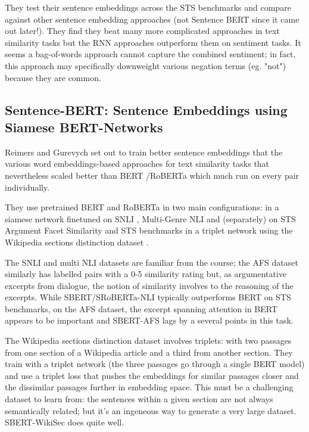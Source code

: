 \documentclass[11pt]{article}
\begin{document}
They test their sentence embeddings across the STS benchmarks and compare against other sentence embedding approaches (not Sentence BERT since it came out later!). They find they beat many more complicated approaches in text similarity tasks but the RNN approaches outperform them on sentiment tasks. It seems a bag-of-words approach cannot capture the combined sentiment; in fact, this approach may specifically downweight various negation terms (eg. "not") because they are common.

\subsection{Sentence-BERT: Sentence Embeddings using Siamese BERT-Networks \cite{Reimers2019}}

Reimers and Gurevych set out to train better sentence embeddings that the various word embeddings-based approaches for text similarity tasks that nevertheless scaled better than BERT /RoBERTa which much run on every pair individually. 

They use pretrained BERT and RoBERTa in two main configurations: in a siamese network finetuned on SNLI \cite{Bowman2015}, Multi-Genre NLI \cite{Williams2018} and (separately) on STS Argument Facet Similarity \cite{Misra2016} and STS benchmarks \cite{Cer2017} in a triplet network using the Wikipedia sections distinction dataset \cite{Dor2018}. 

The SNLI and multi NLI datasets are familiar from the course; the AFS dataset similarly has labelled pairs with a 0-5 similarity rating but, as argumentative excerpts from dialogue, the notion of similarity involves to the reasoning of the excerpts. While SBERT/SRoBERTa-NLI typically outperforms BERT on STS benchmarks, on the AFS dataset, the excerpt spanning attention in BERT appears to be important and SBERT-AFS lags by a several points in this task. 

The Wikipedia sections distinction dataset involves triplets: with two passages from one section of a Wikipedia article and a third from another section. They train with a triplet network (the three passages go through a single BERT model) and use a triplet loss that pushes the embeddings for similar passages closer and the dissimilar passages further in embedding space. This must be a challenging dataset to learn from: the sentences within a given section are not always semantically related; but it's an ingeneous way to generate a very large dataset. SBERT-WikiSec does quite well.
\end{document}
